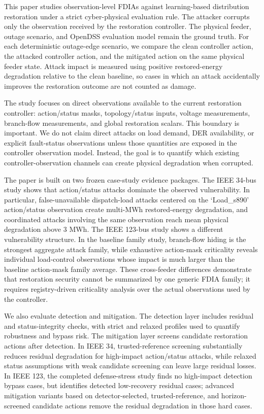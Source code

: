 This paper studies observation-level FDIAs against learning-based distribution restoration under a strict cyber-physical evaluation rule. The attacker corrupts only the observation received by the restoration controller. The physical feeder, outage scenario, and OpenDSS evaluation model remain the ground truth. For each deterministic outage-edge scenario, we compare the clean controller action, the attacked controller action, and the mitigated action on the same physical feeder state. Attack impact is measured using positive restored-energy degradation relative to the clean baseline, so cases in which an attack accidentally improves the restoration outcome are not counted as damage.

The study focuses on direct observations available to the current restoration controller: action/status masks, topology/status inputs, voltage measurements, branch-flow measurements, and global restoration scalars. This boundary is important. We do not claim direct attacks on load demand, DER availability, or explicit fault-status observations unless those quantities are exposed in the controller observation model. Instead, the goal is to quantify which existing controller-observation channels can create physical degradation when corrupted.

The paper is built on two frozen case-study evidence packages. The IEEE 34-bus study shows that action/status attacks dominate the observed vulnerability. In particular, false-unavailable dispatch-load attacks centered on the `Load\_s890' action/status observation create multi-MWh restored-energy degradation, and coordinated attacks involving the same observation reach mean physical degradation above 3 MWh. The IEEE 123-bus study shows a different vulnerability structure. In the baseline family study, branch-flow hiding is the strongest aggregate attack family, while exhaustive action-mask criticality reveals individual load-control observations whose impact is much larger than the baseline action-mask family average. These cross-feeder differences demonstrate that restoration security cannot be summarized by one generic FDIA family; it requires registry-driven criticality analysis over the actual observations used by the controller.

We also evaluate detection and mitigation. The detection layer includes residual and status-integrity checks, with strict and relaxed profiles used to quantify robustness and bypass risk. The mitigation layer screens candidate restoration actions after detection. In IEEE 34, trusted-reference screening substantially reduces residual degradation for high-impact action/status attacks, while relaxed status assumptions with weak candidate screening can leave large residual losses. In IEEE 123, the completed defense-stress study finds no high-impact detection bypass cases, but identifies detected low-recovery residual cases; advanced mitigation variants based on detector-selected, trusted-reference, and horizon-screened candidate actions remove the residual degradation in those hard cases.

